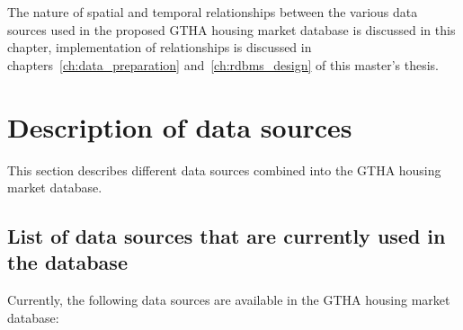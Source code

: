 The nature of spatial and temporal relationships between the various data sources used in the proposed GTHA housing market database is discussed in this chapter, implementation of relationships is discussed in chapters~\ref{ch:data_preparation} and~\ref{ch:rdbms_design} of this master's thesis.


\section{Description of data sources} \label{sec:description_of_data_sources}

This section describes different data sources combined into the GTHA housing market database.

\subsection{List of data sources that are currently used in the database} \label{subsec:list_of_data_sources}

Currently, the following data sources are available in the GTHA housing market database:

